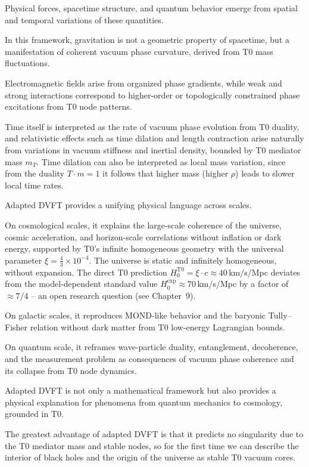 	Physical forces, spacetime structure, and quantum behavior emerge from spatial and temporal variations of these quantities.
	
	In this framework, gravitation is not a geometric property of spacetime, but a manifestation of coherent vacuum phase curvature, derived from T0 mass fluctuations.
	
	Electromagnetic fields arise from organized phase gradients, while weak and strong interactions correspond to higher-order or topologically constrained phase excitations from T0 node patterns.
	
	Time itself is interpreted as the rate of vacuum phase evolution from T0 duality, and relativistic effects such as time dilation and length contraction arise naturally from variations in vacuum stiffness and inertial density, bounded by T0 mediator mass $m_T$. Time dilation can also be interpreted as local mass variation, since from the duality $T \cdot m = 1$ it follows that higher mass (higher $\rho$) leads to slower local time rates.
	
	Adapted DVFT provides a unifying physical language across scales.
	
	On cosmological scales, it explains the large-scale coherence of the universe, cosmic acceleration, and horizon-scale correlations without inflation or dark energy, supported by T0's infinite homogeneous geometry with the universal parameter $\xi = \frac{4}{3} \times 10^{-4}$. The universe is static and infinitely homogeneous, without expansion. The direct T0 prediction $H_0^{\text{T0}} = \xi \cdot c \approx 40\,$km/s/Mpc deviates from the model-dependent standard value $H_0^{\text{exp}} \approx 70\,$km/s/Mpc by a factor of $\approx 7/4$ -- an open research question (see Chapter~9).
	
	On galactic scales, it reproduces MOND-like behavior and the baryonic Tully–Fisher relation without dark matter from T0 low-energy Lagrangian bounds.
	
	On quantum scale, it reframes wave-particle duality, entanglement, decoherence, and the measurement problem as consequences of vacuum phase coherence and its collapse from T0 node dynamics.
	
	Adapted DVFT is not only a mathematical framework but also provides a physical explanation for phenomena from quantum mechanics to cosmology, grounded in T0.
	
	The greatest advantage of adapted DVFT is that it predicts no singularity due to the T0 mediator mass and stable nodes, so for the first time we can describe the interior of black holes and the origin of the universe as stable T0 vacuum cores.
	
